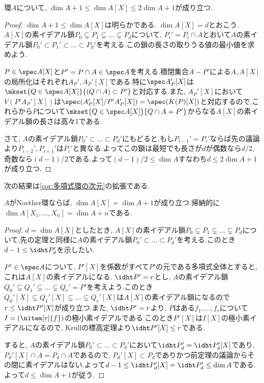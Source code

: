 \begin{thm}
	環$A$について, $\dim A+1\leq\dim A[X]\leq 2\dim A+1$が成り立つ.
\end{thm}

\begin{proof}
	$\dim A+1\leq\dim A[X]$は明らかである. $\dim A[X]=d$とおこう. $A[X]$の素イデアル鎖$P_0\subsetneq P_1\subsetneq\dots\subsetneq P_d$について, $P_i'=P_i\cap A$とおいて$A$の素イデアル鎖$P_0'\subset P_1'\subset\dots\subset P_d'$を考える.この鎖の長さの取りうる値の最小値を求めよう.
	
	$P\in\spec A[X]$と$P'=P\cap A\in\spec A$を考える.積閉集合$A-P'$による$A,A[X]$の局所化はそれぞれ$A_P',A_P'[X]$である.特に$\spec A_P'[X]$は$\mkset{Q\in\spec A[X]}{(Q\cap A)\subset P'}$と対応する.また, $A_P'[X]$において$V(P'A_P'[X])$は$\spec (A_P'[X]/P'A_P'[X])=\spec (K(P)[X])$と対応するので,これらから$P$について$\mkset{Q\in\spec A[X]}{Q\cap A=P'}$からなる$A[X]$の素イデアル鎖の長さは高々1である.
	
	さて, $A$の素イデアル鎖$P_0'\subset\dots\subset P_d'$にもどると,もし$P_{i-1}'=P_i'$ならば先の議論より$P_{i-2}',P_{i+1}'$は$P_i'$と異なる.よってこの鎖は最短でも長さが$d$が偶数なら$d/2$, 奇数なら$(d-1)/2$である.よって$(d-1)/2\leq \dim A$すなわち$d\leq 2\dim A+1$が成り立つ.
\end{proof}

次の結果は\ref{cor:多項式環の次元}の拡張である.

\begin{cor}
	$A$がNoether環ならば, $\dim A[X]=\dim A+1$が成り立つ.帰納的に$\dim A[X_1,\dots,X_n]=\dim A+n$である.
\end{cor}

\begin{proof}
	$d=\dim A[X]$としたとき, $A[X]$の素イデアル鎖$P_0\subsetneq P_1\subsetneq\dots\subsetneq P_d$について,先の定理と同様に$A$の素イデアル鎖$P_0'\subset\dots\subset P_d'$を考える.このとき$d-1\leq\idht P_d'$を示したい.
	
	$P'\in\spec A$について, $P'[X]$を係数がすべて$P'$の元である多項式全体とすると,これは$A[X]$の素イデアルになる. $\idht P'=r$とし, $A$の素イデアル鎖$Q_0'\subsetneq Q_1'\subsetneq\dots\subsetneq Q_r'=P'$を考えよう.このとき$Q_0'[X]\subsetneq Q_1'[X]\subsetneq\dots\subsetneq Q_r'[X]$は$A[X]$の素イデアル鎖になるので$r\leq\idht P'[X]$が成り立つ.また, $\idht P'=r$より, $P$はある$f_1,\dots,f_r$について$I=(\nitem[r]{f})$の極小素イデアルである.このとき$P'[X]$は$I[X]$の極小素イデアルになるので, Krullの標高定理より$\idht P'[X]\leq r$である.
	
	すると, $A$の素イデアル鎖$P_0'\subset\dots\subset P_d'$において$\idht P_d'=\idht P_d'[X]$であり, $P_d'[X]\cap A=P_d\cap A$であるので, $P_d'[X]\subset P_d$でありかつ前定理の議論からその間に素イデアルはない.よって$d-1\leq\idht P_d'[X]=\idht P_d'\leq\dim A$である.よって$d\leq\dim A+1$が従う.
\end{proof}

